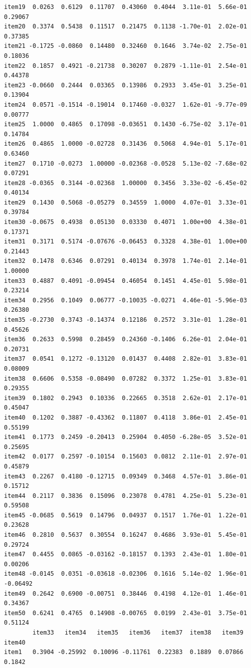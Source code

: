 \documentclass[
  a4paper,
]{ltjsbook}
\begin{document}
\begin{verbatim}
item19  0.0263  0.6129  0.11707  0.43060  0.4044  3.11e-01  5.66e-01  0.29067
item20  0.3374  0.5438  0.11517  0.21475  0.1138 -1.70e-01  2.02e-01  0.37385
item21 -0.1725 -0.0860  0.14480  0.32460  0.1646  3.74e-02  2.75e-01  0.18036
item22  0.1857  0.4921 -0.21738  0.30207  0.2879 -1.11e-01  2.54e-01  0.44378
item23 -0.0660  0.2444  0.03365  0.13986  0.2933  3.45e-01  3.25e-01  0.13904
item24  0.0571 -0.1514 -0.19014  0.17460 -0.0327  1.62e-01 -9.77e-09  0.00777
item25  1.0000  0.4865  0.17098 -0.03651  0.1430 -6.75e-02  3.17e-01  0.14784
item26  0.4865  1.0000 -0.02728  0.31436  0.5068  4.94e-01  5.17e-01  0.63460
item27  0.1710 -0.0273  1.00000 -0.02368 -0.0528  5.13e-02 -7.68e-02  0.07291
item28 -0.0365  0.3144 -0.02368  1.00000  0.3456  3.33e-02 -6.45e-02  0.40134
item29  0.1430  0.5068 -0.05279  0.34559  1.0000  4.07e-01  3.33e-01  0.39784
item30 -0.0675  0.4938  0.05130  0.03330  0.4071  1.00e+00  4.38e-01  0.17371
item31  0.3171  0.5174 -0.07676 -0.06453  0.3328  4.38e-01  1.00e+00  0.21443
item32  0.1478  0.6346  0.07291  0.40134  0.3978  1.74e-01  2.14e-01  1.00000
item33  0.4887  0.4091 -0.09454  0.46054  0.1451  4.45e-01  5.98e-01  0.23214
item34  0.2956  0.1049  0.06777 -0.10035 -0.0271  4.46e-01 -5.96e-03  0.26380
item35 -0.2730  0.3743 -0.14374  0.12186  0.2572  3.31e-01  1.28e-01  0.45626
item36  0.2633  0.5998  0.28459  0.24360 -0.1406  6.26e-01  2.04e-01  0.20731
item37  0.0541  0.1272 -0.13120  0.01437  0.4408  2.82e-01  3.83e-01  0.08009
item38  0.6606  0.5358 -0.08490  0.07282  0.3372  1.25e-01  3.83e-01  0.29355
item39  0.1802  0.2943  0.10336  0.22665  0.3518  2.62e-01  2.17e-01  0.45047
item40  0.1202  0.3887 -0.43362  0.11807  0.4118  3.86e-01  2.45e-01  0.55199
item41  0.1773  0.2459 -0.20413  0.25904  0.4050 -6.28e-05  3.52e-01  0.25695
item42  0.0177  0.2597 -0.10154  0.15603  0.0812  2.11e-01  2.97e-01  0.45879
item43  0.2267  0.4180 -0.12715  0.09349  0.3468  4.57e-01  3.86e-01  0.15712
item44  0.2117  0.3836  0.15096  0.23078  0.4781  4.25e-01  5.23e-01  0.59508
item45 -0.0685  0.5619  0.14796  0.04937  0.1517  1.76e-01  1.22e-01  0.23628
item46  0.2810  0.5637  0.30554  0.16247  0.4686  3.93e-01  5.45e-01  0.29724
item47  0.4455  0.0865 -0.03162 -0.18157  0.1393  2.43e-01  1.80e-01  0.00206
item48 -0.0145  0.0351 -0.03618 -0.02306  0.1616  5.14e-02  1.96e-01 -0.06492
item49  0.2642  0.6900 -0.00751  0.38446  0.4198  4.12e-01  1.46e-01  0.34367
item50  0.6241  0.4765  0.14908 -0.00765  0.0199  2.43e-01  3.75e-01  0.51124
        item33   item34   item35   item36   item37  item38   item39  item40
item1   0.3904 -0.25992  0.10096 -0.11761  0.22383  0.1889  0.07866  0.1842

\end{verbatim}
\end{document}
